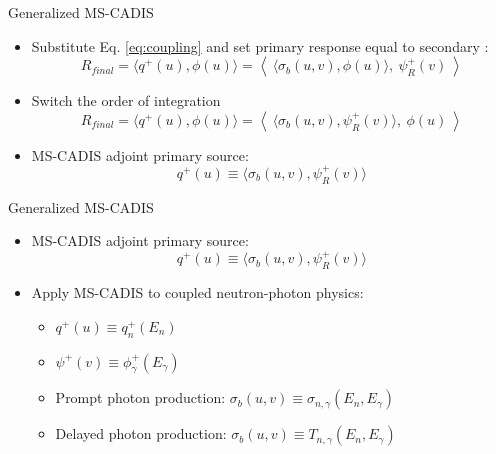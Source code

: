 \documentclass{beamer}
\begin{document}
\begin{frame}{Generalized MS-CADIS}
\begin{itemize}
\item{Substitute Eq. \ref{eq:coupling} and set primary response equal to secondary :}
\begin{equation}
	R_{final} = \langle q^+(u), \phi(u) \rangle
	=\left \langle\  \langle \sigma_b(u,v) , \phi(u) \rangle,\
	\psi_R^{+}(v) \ \right\rangle
\end{equation}
\pause
	\item{Switch the order of integration}
\begin{equation}\label{eq:pseudo-response}
	R_{final} = \langle q^+(u), \phi(u) \rangle
	=\left \langle \ \langle \sigma_b(u,v) , \psi_R^{+}(v) \rangle,\
	\phi(u) \ \right\rangle
\end{equation}
		\vspace{0.2cm}
\pause
\item{MS-CADIS adjoint primary source:}
\begin{equation}
  q^{+}(u) \equiv \langle \sigma_b(u,v) , \psi_R^{+}(v) \rangle
\end{equation}
\end{itemize}
\end{frame}

\begin{frame}{Generalized MS-CADIS}
\begin{itemize}
\item{MS-CADIS adjoint primary source:}
\begin{equation}
  q^{+}(u) \equiv \langle \sigma_b(u,v) , \psi_R^{+}(v) \rangle
\end{equation}
\item{Apply MS-CADIS to coupled neutron-photon physics:}
	\begin{itemize}
		\item{$q^+(u) \equiv q_n^+(E_n)$}
			\vspace{0.1cm}
		\item{$\psi^+(v) \equiv \phi_{\gamma}^+(E_{\gamma})$}
			\vspace{0.1cm}
	\item{Prompt photon production: $\sigma_b(u,v) \equiv \sigma_{n,\gamma}(E_n,
	E_{\gamma})$}
			\vspace{0.1cm}
	\item{Delayed photon production: $\sigma_b(u,v) \equiv 
	T_{n,\gamma}(E_n,E_{\gamma})$}
	\end{itemize}

\end{itemize}
\end{frame}
\end{document}
